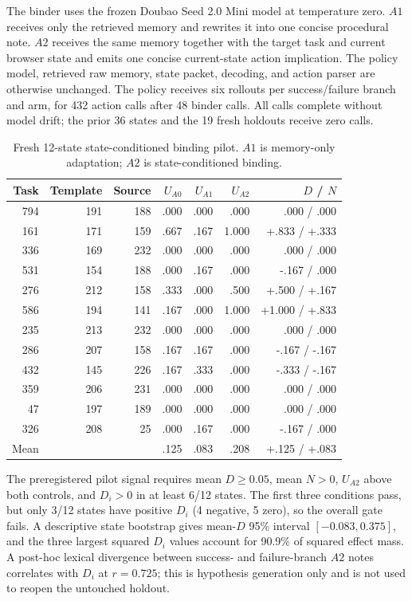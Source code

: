 The binder uses the frozen Doubao Seed 2.0 Mini model at temperature zero. $A1$ receives only the retrieved memory and rewrites it into one concise procedural note. $A2$ receives the same memory together with the target task and current browser state and emits one concise current-state action implication. The policy model, retrieved raw memory, state packet, decoding, and action parser are otherwise unchanged. The policy receives six rollouts per success/failure branch and arm, for 432 action calls after 48 binder calls. All calls complete without model drift; the prior 36 states and the 19 fresh holdouts receive zero calls.

\begin{table}[h]
\centering
\scriptsize
\caption{Fresh 12-state state-conditioned binding pilot. $A1$ is memory-only adaptation; $A2$ is state-conditioned binding.}
\label{tab:scmb-pilot-full}
\begin{tabular}{rrrrrrr}
\toprule
Task & Template & Source & $U_{A0}$ & $U_{A1}$ & $U_{A2}$ & $D$ / $N$ \\
\midrule
794 & 191 & 188 & .000 & .000 & .000 & .000 / .000 \\
161 & 171 & 159 & .667 & .167 & 1.000 & +.833 / +.333 \\
336 & 169 & 232 & .000 & .000 & .000 & .000 / .000 \\
531 & 154 & 188 & .000 & .167 & .000 & -.167 / .000 \\
276 & 212 & 158 & .333 & .000 & .500 & +.500 / +.167 \\
586 & 194 & 141 & .167 & .000 & 1.000 & +1.000 / +.833 \\
235 & 213 & 232 & .000 & .000 & .000 & .000 / .000 \\
286 & 207 & 158 & .167 & .167 & .000 & -.167 / -.167 \\
432 & 145 & 226 & .167 & .333 & .000 & -.333 / -.167 \\
359 & 206 & 231 & .000 & .000 & .000 & .000 / .000 \\
47  & 197 & 189 & .000 & .000 & .000 & .000 / .000 \\
326 & 208 & 25  & .000 & .167 & .000 & -.167 / .000 \\
\midrule
Mean & & & .125 & .083 & .208 & +.125 / +.083 \\
\bottomrule
\end{tabular}
\end{table}

The preregistered pilot signal requires mean $D\ge0.05$, mean $N>0$, $U_{A2}$ above both controls, and $D_i>0$ in at least 6/12 states. The first three conditions pass, but only 3/12 states have positive $D_i$ (4 negative, 5 zero), so the overall gate fails. A descriptive state bootstrap gives mean-$D$ 95\% interval $[-0.083,0.375]$, and the three largest squared $D_i$ values account for 90.9\% of squared effect mass. A post-hoc lexical divergence between success- and failure-branch $A2$ notes correlates with $D_i$ at $r=0.725$; this is hypothesis generation only and is not used to reopen the untouched holdout.
